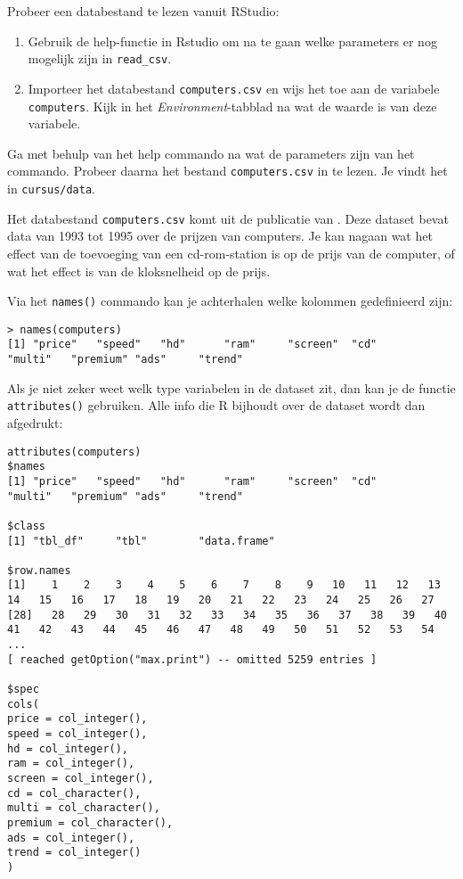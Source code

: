 \begin{exercise}
  Probeer een databestand te lezen vanuit RStudio:
  
  \begin{enumerate}
    \item Gebruik de help-functie in Rstudio om na te gaan welke parameters er nog mogelijk zijn in \texttt{read\_csv}.
    \item Importeer het databestand \texttt{computers.csv} en wijs het toe aan de variabele \texttt{computers}. Kijk in het \textit{Environment}-tabblad na wat de waarde is van deze variabele.
  \end{enumerate}
  
  Ga met behulp van het help commando na wat de parameters zijn van het commando. Probeer daarna het bestand \texttt{computers.csv} in te lezen. Je vindt het in \texttt{cursus/data}.
\end{exercise}

Het databestand \texttt{computers.csv} komt uit de publicatie van \textcite{Stengos2005}. Deze dataset bevat data van 1993 tot 1995 over de prijzen van computers. Je kan nagaan wat het effect van de toevoeging van een cd-rom-station is op de prijs van de computer, of wat het effect is van de kloksnelheid op de prijs. 

Via het \texttt{names()} commando kan je achterhalen welke kolommen gedefinieerd zijn:

\begin{lstlisting}[breaklines=true]
> names(computers)
[1] "price"   "speed"   "hd"      "ram"     "screen"  "cd"      "multi"   "premium" "ads"     "trend"
\end{lstlisting}

Als je niet zeker weet welk type variabelen in de dataset zit, dan kan je de functie \texttt{attributes()} gebruiken. Alle info die R bijhoudt over de dataset wordt dan afgedrukt:

\begin{lstlisting}[breaklines=true]
attributes(computers)
$names
[1] "price"   "speed"   "hd"      "ram"     "screen"  "cd"      "multi"   "premium" "ads"     "trend"  

$class
[1] "tbl_df"     "tbl"        "data.frame"

$row.names
[1]    1    2    3    4    5    6    7    8    9   10   11   12   13   14   15   16   17   18   19   20   21   22   23   24   25   26   27
[28]   28   29   30   31   32   33   34   35   36   37   38   39   40   41   42   43   44   45   46   47   48   49   50   51   52   53   54
...
[ reached getOption("max.print") -- omitted 5259 entries ]

$spec
cols(
price = col_integer(),
speed = col_integer(),
hd = col_integer(),
ram = col_integer(),
screen = col_integer(),
cd = col_character(),
multi = col_character(),
premium = col_character(),
ads = col_integer(),
trend = col_integer()
)

\end{lstlisting}

